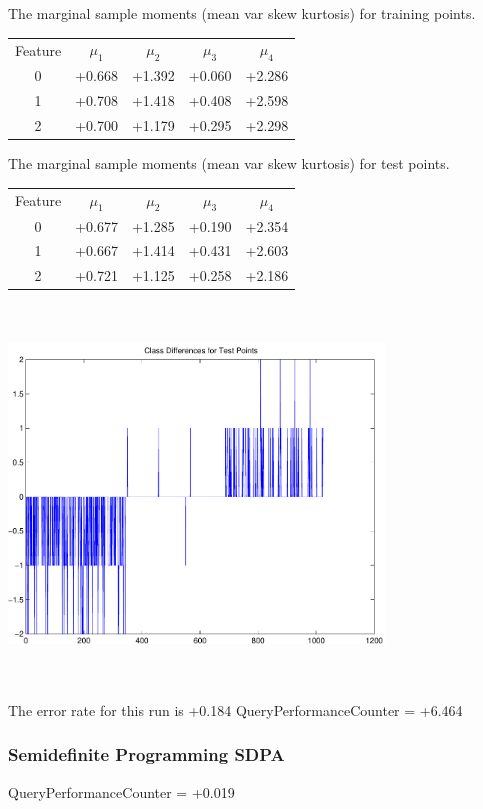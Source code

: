 \documentclass[9pt]{article}
\theoremstyle{plain}
\theoremstyle{definition}
\theoremstyle{remark}
\numberwithin{equation}{section}
\begin{document}
The marginal sample moments (mean var skew kurtosis) for training points.\newline
\begin{tabular}{ c |  c  c  c  c}
Feature & $\mu_1$ & $\mu_2$ & $\mu_3$ & $\mu_4$ \\
0 & +0.668 & +1.392 & +0.060& +2.286 \\
\hline
1 & +0.708 & +1.418 & +0.408& +2.598 \\
\hline
2 & +0.700 & +1.179 & +0.295& +2.298 \\
\hline
\end{tabular}
\newline
The marginal sample moments (mean var skew kurtosis) for test points.\newline
\begin{tabular}{ c | c  c  c  c}
Feature & $\mu_1$ & $\mu_2$ & $\mu_3$ & $\mu_4$ \\
0 & +0.677 & +1.285 & +0.190& +2.354\\
\hline
1 & +0.667 & +1.414 & +0.431& +2.603\\
\hline
2 & +0.721 & +1.125 & +0.258& +2.186\\
\hline
\end{tabular}\newline
\includegraphics[width=10.0cm,height=10.0cm]{classDiffs.pdf}

The error rate for this run is +0.184\newline
QueryPerformanceCounter  =  +6.464
\subsubsection{Semidefinite Programming SDPA}
QueryPerformanceCounter  =  +0.019
\end{document}
